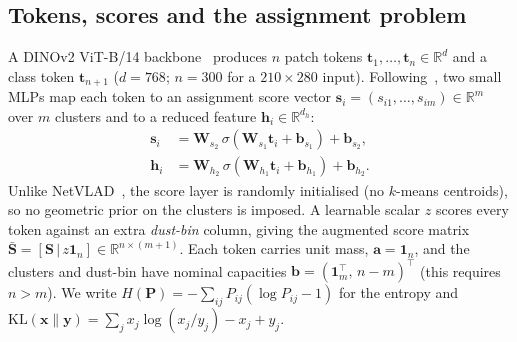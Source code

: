 \subsection{Tokens, scores and the assignment problem}\label{sec:tokens}
A DINOv2 ViT-B/14 backbone~\cite{oquab2024dinov2} produces $n$ patch tokens
$\mathbf{t}_1,\dots,\mathbf{t}_n\in\mathbb{R}^{d}$ and a class token $\mathbf{t}_{n+1}$
($d=768$; $n=300$ for a $210\times280$ input). Following~\cite{izquierdo2024optimal}, two small
MLPs map each token to an assignment score vector
$\mathbf{s}_i=(s_{i1},\dots,s_{im})\in\mathbb{R}^m$ over $m$ clusters and to a reduced feature
$\mathbf{h}_i\in\mathbb{R}^{d_h}$:
\begin{equation}
\begin{aligned}
\mathbf{s}_i&=\mathbf{W}_{s_2}\,\sigma(\mathbf{W}_{s_1}\mathbf{t}_i+\mathbf{b}_{s_1})+\mathbf{b}_{s_2},\\
\mathbf{h}_i&=\mathbf{W}_{h_2}\,\sigma(\mathbf{W}_{h_1}\mathbf{t}_i+\mathbf{b}_{h_1})+\mathbf{b}_{h_2}.
\end{aligned}
\label{eq:mlps}
\end{equation}
Unlike NetVLAD~\cite{arandjelovic2016netvlad}, the score layer is randomly initialised (no
$k$-means centroids), so no geometric prior on the clusters is imposed. A learnable scalar $z$
scores every token against an extra \emph{dust-bin} column, giving the augmented score matrix
$\bar{\mathbf{S}}=[\mathbf{S}\,|\,z\mathbf{1}_n]\in\mathbb{R}^{n\times(m+1)}$. Each token carries
unit mass, $\mathbf{a}=\mathbf{1}_n$, and the clusters and dust-bin have nominal capacities
$\mathbf{b}=(\mathbf{1}_m^\top,\,n-m)^\top$ (this requires $n>m$). We write
$H(\mathbf{P})=-\sum_{ij}P_{ij}(\log P_{ij}-1)$ for the entropy and
$\mathrm{KL}(\mathbf{x}\|\mathbf{y})=\sum_j x_j\log(x_j/y_j)-x_j+y_j$.

